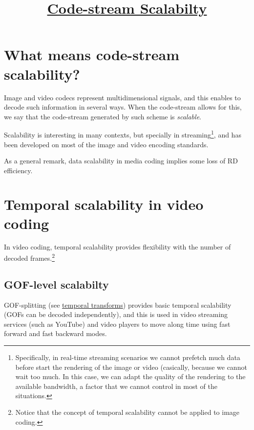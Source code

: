 



\title{\href{https://sistemas-multimedia.github.io/contents/data_scalability/}{Code-stream Scalabilty}}

\maketitle
\tableofcontents

\section{What means code-stream scalability?}

Image and video codecs represent multidimensional signals, and this
enables to decode such information in several ways. When the
code-stream allows for this, we say that the code-stream generated by such
scheme is \emph{scalable}.

Scalability is interesting in many contexts, but specially in
streaming\footnote{Specifically, in real-time streaming scenarios we
  cannot prefetch much data before start the rendering of the image or
  video (casically, because we cannot wait too much. In this case, we
  can adapt the quality of the rendering to the available bandwidth, a
  factor that we cannot control in most of the situations.}, and has
been developed on most of the image and video encoding standards.

As a general remark, data scalability in media coding implies some
loss of RD efficiency.


\section{Temporal scalability in video coding~\cite{vruiz__video_scalability}}


In video coding, temporal scalability provides flexibility with the
number of decoded frames.\footnote{Notice that the concept of temporal
scalability cannot be applied to image coding.}

\subsection{GOF-level scalabilty}
GOF-splitting (see
\href{https://sistemas-multimedia.github.io/contents/temporal_transforms/}{temporal
  transforms}) provides basic temporal scalability (GOFs can be
decoded independently), and this is used in video streaming services
(such as YouTube) and video players to move along time using fast
forward and fast backward modes.
  
